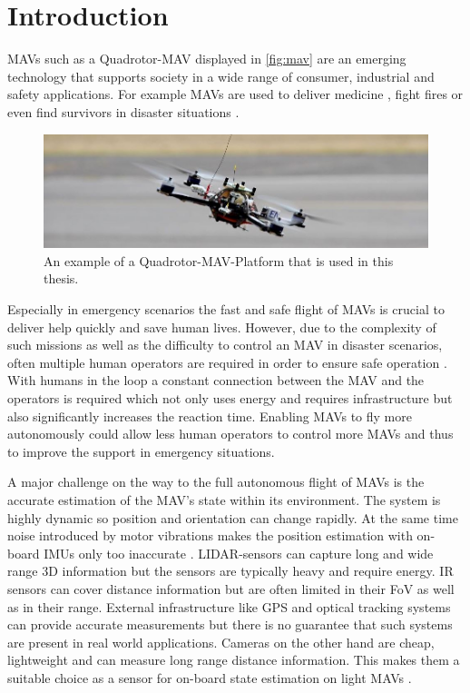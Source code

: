 \chapter{Introduction}
\label{sec:intro}
\acresetall
\acp{MAV} such as a Quadrotor-\ac{MAV} displayed in \autoref{fig:mav} are an emerging technology that supports society in a wide range of consumer, industrial and safety applications. For example \acp{MAV} are used to deliver medicine \cite{Shankland2018}, fight fires \cite{KateBaggaley2017} or even find survivors in disaster situations \cite{JoshuaBateman2017}.

\begin{figure}[b]
	\centering
	\includegraphics[width=\textwidth]{fig/mav}
	\caption{An example of a Quadrotor-\ac{MAV}-Platform that is used in this thesis.}
	\label{fig:mav}
\end{figure}

Especially in emergency scenarios the fast and safe flight of \acp{MAV} is crucial to deliver help quickly and save human lives. However, due to the complexity of such missions as well as the difficulty to control an \ac{MAV} in disaster scenarios, often multiple human operators are required in order to ensure safe operation \cite{Murphy2016}. With humans in the loop a constant connection between the \ac{MAV} and the operators is required which not only uses energy and requires infrastructure but also significantly increases the reaction time. Enabling \acp{MAV} to fly more autonomously could allow less human operators to control more \acp{MAV} and thus to improve the support in emergency situations.

A major challenge on the way to the full autonomous flight of \acp{MAV} is the accurate estimation of the \ac{MAV}'s state within its environment. The system is highly dynamic so position and orientation can change rapidly. At the same time noise introduced by motor vibrations makes the position estimation with on-board \acp{IMU} only too inaccurate \cite{Mohamed2014}. \ac{LIDAR}-sensors can capture long and wide range 3D information but the sensors are typically heavy and require energy. \ac{IR} sensors can cover distance information but are often limited in their \ac{FoV} as well as in their range. External infrastructure like \ac{GPS} and optical tracking systems can provide accurate measurements but there is no guarantee that such systems are present in real world applications. Cameras on the other hand are cheap, lightweight and can measure long range distance information. This makes them a suitable choice as a sensor for on-board state estimation on light \acp{MAV} \cite{Elbanhawi2017}.

